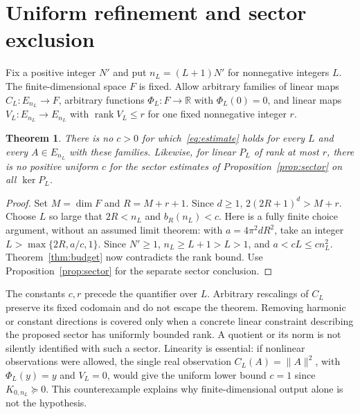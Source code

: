\documentclass[11pt]{article}
\newtheorem{theorem}{Theorem}[section]
\newcommand{\R}{\mathbb R}
\newcommand{\rank}{\operatorname{rank}}
\begin{document}
\section{Uniform refinement and sector exclusion}
Fix a positive integer $N'$ and put $n_L=(L+1)N'$ for nonnegative integers $L$.
The finite-dimensional space $F$ is fixed. Allow arbitrary families
of linear maps $C_L:E_{n_L}\to F$, arbitrary functions $\Phi_L:F\to\R$
with $\Phi_L(0)=0$, and linear maps $V_L:E_{n_L}\to E_{n_L}$ with
$\rank V_L\leq r$ for one fixed nonnegative integer $r$.
\begin{theorem}\label{thm:uniform}
There is no $c>0$ for which~\eqref{eq:estimate} holds for every $L$ and every
$A\in E_{n_L}$ with these families. Likewise, for linear $P_L$ of rank at
most $r$, there is no positive uniform $c$ for the sector estimates of
Proposition~\ref{prop:sector} on all $\ker P_L$.
\end{theorem}
\begin{proof}
Set $M=\dim F$ and $R=M+r+1$. Since $d\geq1$,
$2(2R+1)^d>M+r$. Choose $L$ so large that $2R<n_L$ and $b_R(n_L)<c$.
Here is a fully finite choice argument, without an assumed limit theorem:
with $a=4\pi^2dR^2$, take an integer
$L>\max\{2R,a/c,1\}$. Since $N'\geq1$, $n_L\geq L+1>L>1$, and
$a<cL\leq cn_L^2$. Theorem~\ref{thm:budget} now contradicts the rank bound.
Use Proposition~\ref{prop:sector} for the separate sector conclusion.
\end{proof}
The constants $c,r$ precede the quantifier over $L$. Arbitrary rescalings of
$C_L$ preserve its fixed codomain and do not escape the theorem. Removing
harmonic or constant directions is covered only when a concrete linear
constraint describing the proposed sector has uniformly bounded rank.
A quotient or its norm is not silently identified with such a sector.
Linearity is essential: if nonlinear observations were allowed, the single
real observation $C_L(A)=\|A\|^2$, with $\Phi_L(y)=y$ and $V_L=0$, would give
the uniform lower bound $c=1$ since $K_{0,n_L}\succeq0$. This counterexample
explains why finite-dimensional output alone is not the hypothesis.
\end{document}
